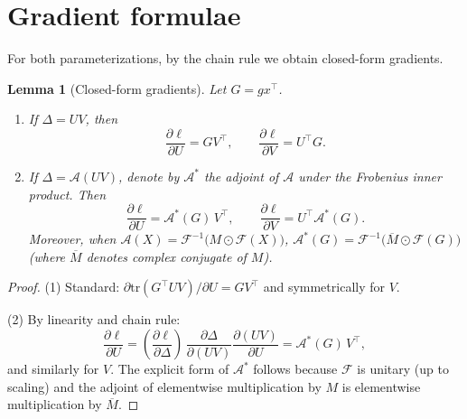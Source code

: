 \documentclass{article}
\theoremstyle{plain}
\newtheorem{lemma}[theorem]{Lemma}
\theoremstyle{definition}
\theoremstyle{remark}
\begin{document}
\section*{Gradient formulae}
For both parameterizations, by the chain rule we obtain closed-form gradients.

\begin{lemma}[Closed-form gradients]
\label{lem:grad_forms}
Let \(G = g x^\top\).
\begin{enumerate}
\item If \(\Delta = UV\), then
\[
\frac{\partial \ell}{\partial U} = G V^\top,\qquad
\frac{\partial \ell}{\partial V} = U^\top G.
\]
\item If \(\Delta = \mathcal{A}(UV)\), denote by \(\mathcal{A}^*\) the adjoint of \(\mathcal{A}\) under the Frobenius inner product. Then
\[
\frac{\partial \ell}{\partial U} = \mathcal{A}^*(G)\,V^\top,\qquad
\frac{\partial \ell}{\partial V} = U^\top \mathcal{A}^*(G).
\]
Moreover, when \(\mathcal{A}(X)=\mathcal{F}^{-1}\big(M\odot\mathcal{F}(X)\big)\),
\(
\mathcal{A}^*(G)=\mathcal{F}^{-1}\big(\overline{M}\odot\mathcal{F}(G)\big)
\)
(where \(\overline{M}\) denotes complex conjugate of \(M\)).
\end{enumerate}
\end{lemma}

\begin{proof}
(1) Standard: \(\partial \mathrm{tr}(G^\top UV)/\partial U = G V^\top\) and symmetrically for \(V\).

(2) By linearity and chain rule:
\[
\frac{\partial \ell}{\partial U}
= \left(\frac{\partial \ell}{\partial \Delta}\right)\, \frac{\partial \Delta}{\partial (UV)} \frac{\partial (UV)}{\partial U}
= \mathcal{A}^*(G)\,V^\top,
\]
and similarly for \(V\). The explicit form of \(\mathcal{A}^*\) follows because \(\mathcal{F}\) is unitary (up to scaling) and the adjoint of elementwise multiplication by \(M\) is elementwise multiplication by \(\overline{M}\).
\qedhere
\end{proof}
\end{document}
